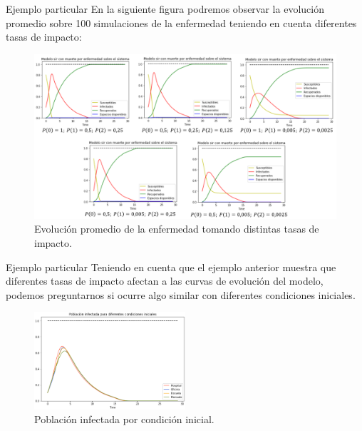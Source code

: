 \documentclass[9pt]{beamer}
\begin{document}
\begin{frame}{Ejemplo particular}
En la siguiente figura podremos observar la evolución promedio sobre 100 simulaciones de la enfermedad teniendo en cuenta diferentes tasas de impacto:

\begin{figure}[h]
  \centering
    \includegraphics[width=1\textwidth]{Imagenes/comparacionTasasImpacto.PNG}
    \caption{Evolución promedio de la enfermedad tomando distintas tasas de impacto.}
    \label{fig:comparacionTasasdeImpacto}
\end{figure}
\end{frame}

\begin{frame}{Ejemplo particular}
Teniendo en cuenta que el ejemplo anterior muestra que diferentes tasas de impacto afectan a las curvas de evolución del modelo, podemos preguntarnos si ocurre algo similar con diferentes condiciones iniciales. 

\begin{figure}[h]
  \centering
    \includegraphics[width=0.5\textwidth]{Imagenes/condicionesIniciales.png}
    \caption{Población infectada por condición inicial.}
    \label{fig:condicionesIniciales}
\end{figure}
\end{frame}
\end{document}
